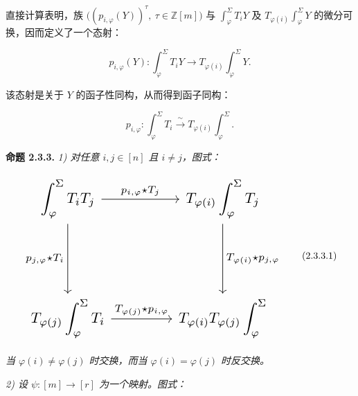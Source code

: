 \clearpage
{}%
直接计算表明，族
$\bigl((p_{i,\varphi}(Y))^\tau,\ \tau\in\mathbb Z[m]\bigr)$
与 $\int_\varphi^\Sigma T_iY$ 及
$T_{\varphi(i)}\int_\varphi^\Sigma Y$ 的微分可换，因而定义了一个态射：

\begin{equation}
  p_{i,\varphi}(Y)\colon
  \int_\varphi^\Sigma T_iY
  \longrightarrow
  T_{\varphi(i)}\int_\varphi^\Sigma Y.
  \tag{2.3.2.2}
\end{equation}

该态射是关于 $Y$ 的函子性同构，从而得到函子同构：

\begin{equation}
  p_{i,\varphi}\colon
  \int_\varphi^\Sigma T_i
  \xrightarrow{\ \sim\ }
  T_{\varphi(i)}\int_\varphi^\Sigma.
  \tag{2.3.2.3}
\end{equation}

\noindent\textbf{命题 2.3.3.}\quad
\emph{1) 对任意 $i,j\in[n]$ 且 $i\ne j$，图式：}

\begin{equation}
  \resizebox{0.78\textwidth}{!}{%
    $\begin{tikzcd}[ampersand replacement=\&,column sep=4.2em,row sep=4.8em]
      \displaystyle\int_\varphi^\Sigma T_iT_j
        \arrow[r,"{p_{i,\varphi}\star T_j}"]
        \arrow[d,"{p_{j,\varphi}\star T_i}"']
        \& \displaystyle T_{\varphi(i)}\int_\varphi^\Sigma T_j
          \arrow[d,"{T_{\varphi(i)}\star p_{j,\varphi}}"] \\
      \displaystyle T_{\varphi(j)}\int_\varphi^\Sigma T_i
        \arrow[r,"{T_{\varphi(j)}\star p_{i,\varphi}}"]
        \& \displaystyle T_{\varphi(i)}T_{\varphi(j)}\int_\varphi^\Sigma
    \end{tikzcd}$%
  }
  \tag{2.3.3.1}
\end{equation}

\emph{当 $\varphi(i)\ne\varphi(j)$ 时交换，而当
$\varphi(i)=\varphi(j)$ 时反交换。}

\emph{2) 设 $\psi\colon[m]\longrightarrow[r]$ 为一个映射。图式：}

